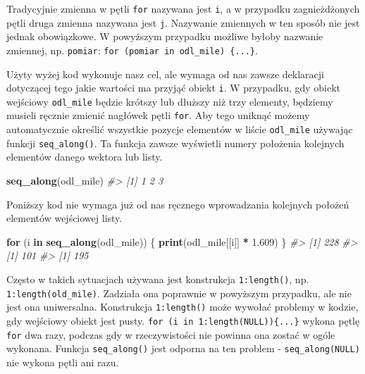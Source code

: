 \documentclass[paper=6in:9in,pagesize=pdftex,headinclude=on,footinclude=on,10pt]{scrbook}
\makeatletter
\newenvironment{Shaded}{\begin{snugshade}}{\end{snugshade}}
\newcommand{\CommentTok}[1]{\textcolor[rgb]{0.56,0.35,0.01}{\textit{#1}}}
\newcommand{\ControlFlowTok}[1]{\textcolor[rgb]{0.13,0.29,0.53}{\textbf{#1}}}
\newcommand{\FloatTok}[1]{\textcolor[rgb]{0.00,0.00,0.81}{#1}}
\newcommand{\KeywordTok}[1]{\textcolor[rgb]{0.13,0.29,0.53}{\textbf{#1}}}
\newcommand{\NormalTok}[1]{#1}
\newcommand{\OperatorTok}[1]{\textcolor[rgb]{0.81,0.36,0.00}{\textbf{#1}}}
\newcommand{\StringTok}[1]{\textcolor[rgb]{0.31,0.60,0.02}{#1}}
\newenvironment{kframe}{%
\medskip{}
\setlength{\fboxsep}{.8em}
 \def\at@end@of@kframe{}%
 \ifinner\ifhmode%
  \def\at@end@of@kframe{\end{minipage}}%
  \begin{minipage}{\columnwidth}%
 \fi\fi%
 \def\FrameCommand##1{\hskip\@totalleftmargin \hskip-\fboxsep
 \colorbox{shadecolor}{##1}\hskip-\fboxsep
     \hskip-\linewidth \hskip-\@totalleftmargin \hskip\columnwidth}%
 \MakeFramed {\advance\hsize-\width
   \@totalleftmargin\z@ \linewidth\hsize
   \@setminipage}}%
 {\par\unskip\endMakeFramed%
 \at@end@of@kframe}
\newenvironment{rmdblock}[1]
  {
  \begin{itemize}
  \renewcommand{\labelitemi}{
    \raisebox{-.7\height}[0pt][0pt]{
      {\setkeys{Gin}{width=3em,keepaspectratio}\texttt{[image: images/\#1]}}
    }
  }
  \setlength{\fboxsep}{1em}
  \begin{kframe}
  \item
  }
  {
  \end{kframe}
  \end{itemize}
  }
\newenvironment{rmdinfo}
  {\begin{rmdblock}{compass}}
  {\end{rmdblock}}
\makeatother
\begin{document}
\begin{rmdinfo}
\begin{rmdinfo}

Tradycyjnie zmienna w pętli \texttt{for} nazywana jest \texttt{i}, a w przypadku zagnieżdżonych pętli druga zmienna nazywana jest \texttt{j}.
Nazywanie zmiennych w ten sposób nie jest jednak obowiązkowe.
W powyższym przypadku możliwe byłoby nazwanie zmiennej, np. \texttt{pomiar}: \texttt{for\ (pomiar\ in\ odl\_mile)\ \{...\}}.

\end{rmdinfo}
\end{rmdinfo}

Użyty wyżej kod wykonuje nasz cel, ale wymaga od nas zawsze deklaracji dotyczącej tego jakie wartości ma przyjąć obiekt \texttt{i}.
W przypadku, gdy obiekt wejściowy \texttt{odl\_mile} będzie krótszy lub dłuższy niż trzy elementy, będziemy musieli ręcznie zmienić nagłówek pętli \texttt{for}.
Aby tego uniknąć możemy automatycznie określić wszystkie pozycje elementów w liście \texttt{odl\_mile} używając funkcji \texttt{seq\_along()}.
Ta funkcja zawsze wyświetli numery położenia kolejnych elementów danego wektora lub listy.

\begin{Shaded}
\begin{Highlighting}[]
\KeywordTok{seq_along}\NormalTok{(odl_mile)}
\CommentTok{#> [1] 1 2 3}
\end{Highlighting}
\end{Shaded}

Poniższy kod nie wymaga już od nas ręcznego wprowadzania kolejnych położeń elementów wejściowej listy.

\begin{Shaded}
\begin{Highlighting}[]
\ControlFlowTok{for}\NormalTok{ (i }\ControlFlowTok{in} \KeywordTok{seq_along}\NormalTok{(odl_mile)) \{}
  \KeywordTok{print}\NormalTok{(odl_mile[[i]] }\OperatorTok{*}\StringTok{ }\FloatTok{1.609}\NormalTok{)}
\NormalTok{\}}
\CommentTok{#> [1] 228}
\CommentTok{#> [1] 101}
\CommentTok{#> [1] 195}
\end{Highlighting}
\end{Shaded}

\begin{rmdinfo}
\begin{rmdinfo}

Często w takich sytuacjach używana jest konstrukcja \texttt{1:length()}, np. \texttt{1:length(old\_mile)}.
Zadziała ona poprawnie w powyższym przypadku, ale nie jest ona uniwersalna.
Konstrukcja \texttt{1:length()} może wywołać problemy w kodzie, gdy wejściowy obiekt jest pusty.
\texttt{for\ (i\ in\ 1:length(NULL))\{...\}} wykona pętlę \texttt{for} dwa razy, podczas gdy w rzeczywistości nie powinna ona zostać w ogóle wykonana.
Funkcja \texttt{seq\_along()} jest odporna na ten problem - \texttt{seq\_along(NULL)} nie wykona pętli ani razu.

\end{rmdinfo}
\end{rmdinfo}
\end{document}
